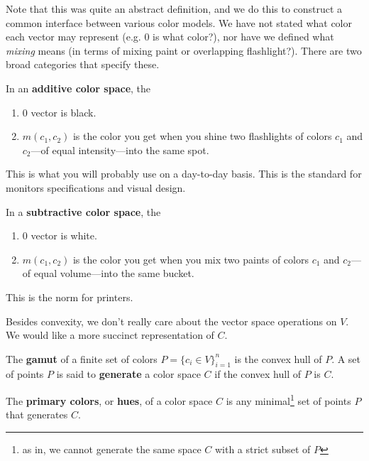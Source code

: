 Note that this was quite an abstract definition, and we do this to construct a common interface between various color models. We have not stated what color each vector may represent (e.g. $0$ is what color?), nor have we defined what \textit{mixing} means (in terms of mixing paint or overlapping flashlight?). There are two broad categories that specify these. 

\begin{definition} 
  In an \textbf{additive color space}, the 
  \begin{enumerate}
    \item $0$ vector is black. 
    \item $m(c_1, c_2)$ is the color you get when you shine two flashlights of colors $c_1$ and $c_2$---of equal intensity---into the same spot. 
  \end{enumerate}
  This is what you will probably use on a day-to-day basis. This is the standard for monitors specifications and visual design. 
\end{definition}

\begin{definition}
  In a \textbf{subtractive color space}, the 
  \begin{enumerate}
    \item $0$ vector is white. 
    \item $m(c_1, c_2)$ is the color you get when you mix two paints of colors $c_1$ and $c_2$---of equal volume---into the same bucket. 
  \end{enumerate} 
  This is the norm for printers. 
\end{definition} 

Besides convexity, we don't really care about the vector space operations on $V$. We would like a more succinct representation of $C$. 

\begin{definition}[Gamut]
  The \textbf{gamut} of a finite set of colors $P = \{c_i \in V \}_{i=1}^n $ is the convex hull of $P$. A set of points $P$ is said to \textbf{generate} a color space $C$ if the convex hull of $P$ is $C$. 
\end{definition} 

\begin{definition}
  The \textbf{primary colors}, or \textbf{hues}, of a color space $C$ is any minimal\footnote{as in, we cannot generate the same space $C$ with a strict subset of $P$} set of points $P$ that generates $C$. 
\end{definition}

